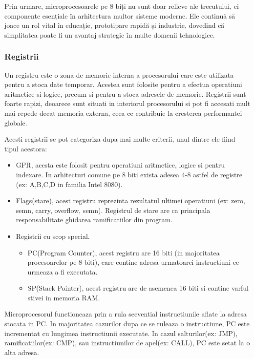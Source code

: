 \documentclass[titlepage,12pt]{article}
\begin{document}
Prin urmare, microprocesoarele pe 8 biți nu sunt doar relicve ale trecutului, ci componente esențiale în arhitectura multor sisteme moderne. Ele continuă să joace un rol vital în educație, prototipare rapidă și industrie, dovedind că simplitatea poate fi un avantaj strategic în multe domenii tehnologice.

\subsubsection{Registrii}

Un registru este o zona de memorie interna a procesorului care este utilizata pentru a stoca date temporar. Acestea sunt folosite pentru a efectua operatiuni aritmetice si logice, precum si pentru a stoca adresele de memorie.
Registrii sunt foarte rapizi, deoarece sunt situati in interiorul procesorului si pot fi accesati mult mai repede decat memoria externa, ceea ce contribuie la cresterea performantei globale.

Acesti registrii se pot categoriza dupa mai multe criterii, unul dintre ele fiind tipul acestora:
\begin{itemize}

    \item \ac {GPR}, acesta este folosit pentru operatiuni aritmetice, logice si pentru indexare. In arhitecturi comune pe 8 biti exista adesea 4-8 astfel de registre (ex: A,B,C,D in familia Intel 8080).
    \item Flags(stare), acest registru reprezinta rezultatul ultimei operatiuni (ex: zero, semn, carry, overflow, semn). Registrul de stare are ca principala responsabilitate ghidarea ramificatiilor din program.
    \item Registrii cu scop special.
    \begin{itemize}
        \item PC(Program Counter), acest registru are 16 biti (in majoritatea procesoarelor pe 8 biti), care contine adresa urmatoarei instructiuni ce urmeaza a fi executata.
        \item SP(Stack Pointer), acest registru are de asemenea 16 biti si contine varful stivei in memoria RAM.
    \end{itemize}

\end{itemize}

Microprocesorul functioneaza prin a rula secvential instructiunile aflate la adresa stocata in PC.
In majoritatea cazurilor dupa ce se ruleaza o instructiune, PC este incrementat cu lungimea instructiunii executate.
In cazul salturilor(ex: JMP), ramificatiilor(ex: CMP), sau instructiunilor de apel(ex: CALL), PC este setat la o alta adresa.
\end{document}
